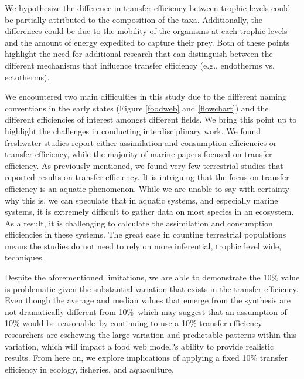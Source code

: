 \documentclass[oneside,12pt,final]{sty/ucthesis-CA2012}
\begin{document}
\begin{mainmatter}
\vspace{5mm}

We hypothesize the difference in transfer efficiency between trophic levels could be partially attributed to the composition of the taxa. Additionally, the differences could be due to the mobility of the organisms at each trophic levels and the amount of energy expedited to capture their prey. Both of these points highlight the need for additional research that can distinguish between the different mechanisms that influence transfer efficiency (e.g., endotherms vs. ectotherms).

\vspace{5mm}

We encountered two main difficulties in this study due to the different naming conventions in the early states (Figure \ref{foodweb} and \ref{flowchart}) and the different efficiencies of interest amongst different fields. We bring this point up to highlight the challenges in conducting interdisciplinary work. We found freshwater studies report either assimilation and consumption efficiencies or transfer efficiency, while the majority of marine papers focused on transfer efficiency. As previously mentioned, we found very few terrestrial studies that reported results on transfer efficiency. It is intriguing that the focus on transfer efficiency is an aquatic phenomenon. While we are unable to say with certainty why this is, we can speculate that in aquatic systems, and especially marine systems, it is extremely difficult to gather data on most species in an ecosystem. As a result, it is challenging to calculate the assimilation and consumption efficiencies in these systems. The great ease in counting terrestrial populations means the studies do not need to rely on more inferential, trophic level wide, techniques.

\vspace{5mm}

Despite the aforementioned limitations, we are able to demonstrate the 10\% value is problematic given the substantial variation that exists in the transfer efficiency. Even though the average and median values that emerge from the synthesis are not dramatically different from 10\%--which may suggest that an assumption of 10\% would be reasonable--by continuing to use a 10\% transfer efficiency researchers are eschewing the large variation and predictable patterns within this variation, which will impact a food web model?s ability to provide realistic results. From here on, we explore implications of applying a fixed 10\% transfer efficiency in ecology, fisheries, and aquaculture.


\end{mainmatter}
\end{document}
